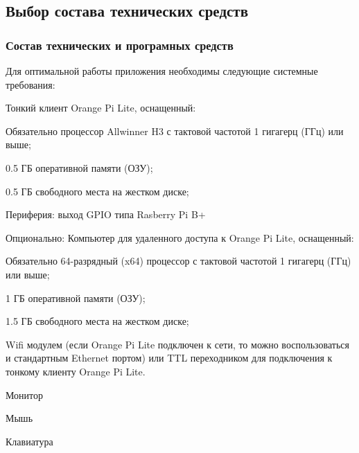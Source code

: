 \subsection{Выбор состава технических средств}

\subsubsection{Состав технических и програмных средств}
Для оптимальной работы приложения необходимы следующие системные требования:
\begin{my_enumerate}

\item Тонкий клиент Orange Pi Lite, оснащенный:
    \begin{my_enumerate}
    \item Обязательно процессор Allwinner H3 с тактовой частотой 1 гигагерц (ГГц) или выше;
    \item 0.5 ГБ оперативной памяти (ОЗУ);
    \item 0.5 ГБ свободного места на жестком диске;
    \item Периферия: выход GPIO типа Rasberry Pi B+
    \end{my_enumerate}
\item Опционально: Компьютер для удаленного доступа к Orange Pi Lite, оснащенный:
    \begin{my_enumerate}
    \item Обязательно 64-разрядный (x64) процессор с тактовой частотой 1 гигагерц (ГГц) или выше;
    \item 1 ГБ оперативной памяти (ОЗУ);
    \item 1.5 ГБ свободного места на жестком диске;
    \item Wifi модулем (если Orange Pi Lite подключен к сети, то можно воспользоваться и стандартным Ethernet портом) или TTL переходником для подключения к тонкому клиенту Orange Pi Lite.
    \end{my_enumerate}
\item Монитор
\item Мышь
\item Клавиатура
\end{my_enumerate}
